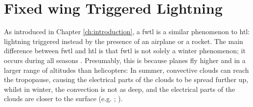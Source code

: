 \section{Fixed wing Triggered Lightning}\label{sec:fwtl}

As introduced in Chapter \ref{ch:introduction}, a \acrfull{fwtl} is a similar phenomenon to \acrshort{htl}: lightning triggered instead by the presence of an airplane or a rocket. The main difference between \acrshort{fwtl} and \acrshort{htl} is that \acrshort{fwtl} is not solely a winter phenomenon; it occurs during all seasons \cite{uman2003}. Presumably, this is because planes fly higher and in a larger range of altitudes than helicopters: In summer, convective clouds can reach the tropopause, causing the electrical parts of the clouds to be spread further up, whilst in winter, the convection is not as deep, and the electrical parts of the clouds are closer to the surface (e.g. \cite{uman2003}; \cite{michimoto2007}).


